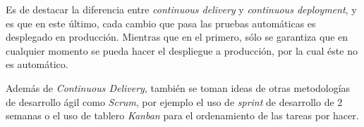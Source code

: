Es de destacar la diferencia entre \textit{continuous delivery} y \textit{continuous deployment}, y es que en este último, cada cambio que pasa las pruebas automáticas es desplegado en producción. Mientras que en el primero, sólo se garantiza que en cualquier momento se pueda hacer el despliegue a producción, por la cual éste no es automático.

Además de \textit{Continuous Delivery}, también se toman ideas de otras metodologías de desarrollo ágil como \textit{Scrum}, por ejemplo el uso de \textit{sprint} de desarrollo de 2 semanas o el uso de tablero \textit{Kanban} para el ordenamiento de las tareas por hacer.
